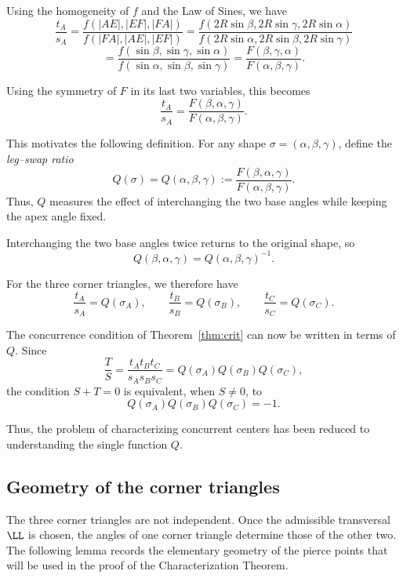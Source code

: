 \documentclass[12pt,a4paper]{amsart}
\theoremstyle{remark}
\begin{document}
Using the homogeneity of $f$ and the Law of Sines, we have
$$\frac{t_A}{s_A}=\frac{f(|AE|,|EF|,|FA|)}{f(|FA|,|AE|,|EF|)}=
\frac{f(2R\sin\beta,2R\sin\gamma,2R\sin\alpha)}{f(2R\sin\alpha,2R\sin\beta,2R\sin\gamma)}$$
$$=\frac{f(\sin\beta,\sin\gamma,\sin\alpha)}{f(\sin\alpha,\sin\beta,\sin\gamma)}
=\frac{F(\beta,\gamma,\alpha)}{F(\alpha,\beta,\gamma)}.$$

Using the symmetry of $F$ in its last two variables, this becomes
\[
\frac{t_A}{s_A}
=
\frac{F(\beta,\alpha,\gamma)}
     {F(\alpha,\beta,\gamma)}.
\]

This motivates the following definition.  For any shape
$\sigma=(\alpha,\beta,\gamma)$, define the \emph{leg--swap ratio}
\begin{equation*}
Q(\sigma)
=
Q(\alpha,\beta,\gamma)
:=
\frac{F(\beta,\alpha,\gamma)}
     {F(\alpha,\beta,\gamma)}.
\end{equation*}
Thus, $Q$ measures the effect of interchanging the two base angles while keeping
the apex angle fixed.

Interchanging the two base angles twice returns to the original shape, so
\[
Q(\beta,\alpha,\gamma)=Q(\alpha,\beta,\gamma)^{-1}.
\]

For the three corner triangles, we therefore have
\[
\frac{t_A}{s_A}=Q(\sigma_A),\qquad
\frac{t_B}{s_B}=Q(\sigma_B),\qquad
\frac{t_C}{s_C}=Q(\sigma_C).
\]

The concurrence condition of Theorem~\ref{thm:crit} can now be written in terms of $Q$.
Since
\[
\frac{T}{S}
=
\frac{t_At_Bt_C}{s_As_Bs_C}
=
Q(\sigma_A)Q(\sigma_B)Q(\sigma_C),
\]
the condition $S+T=0$ is equivalent, when $S\neq0$, to
\begin{equation}
\label{eq:crit-Q}
Q(\sigma_A)Q(\sigma_B)Q(\sigma_C)=-1.
\end{equation}

Thus, the problem of characterizing concurrent centers has been reduced to
understanding the single function $Q$.

\subsection{Geometry of the corner triangles}

The three corner triangles are not independent.  Once the admissible transversal
$\LL$ is chosen, the angles of one corner triangle determine those of the other
two.  The following lemma records the elementary geometry of the pierce points
that will be used in the proof of the Characterization Theorem.
\end{document}
